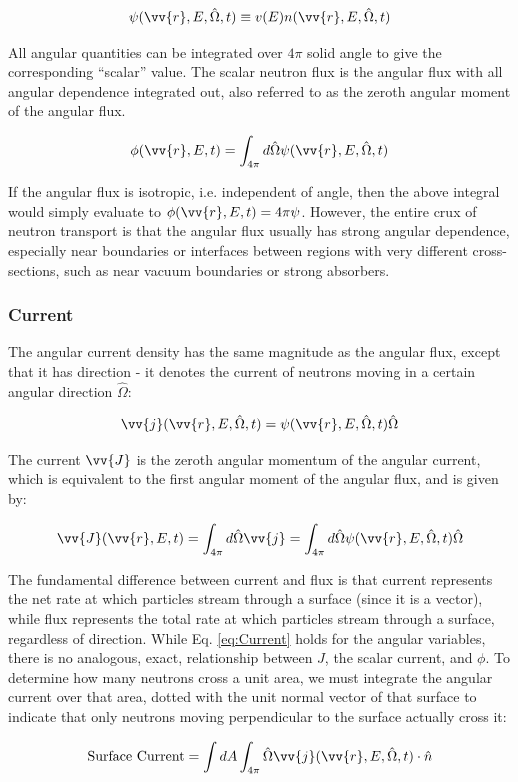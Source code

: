 \documentclass[10pt]{article}
\newcommand{\beq}{\begin{equation}}
\newcommand{\eeq}{\end{equation}}
\newcommand{\hO}{\hat{\Omega}}
\newcommand{\spa}{(\vv{r}, E, \hO, t)}
\newcommand{\spas}{(\vv{r},E,t)}
\begin{document}
\begin{flushleft}
\beq
\label{eq:AngularFlux}
\psi\spa \equiv v(E)n\spa
\eeq

All angular quantities can be integrated over \(4\pi\) solid angle to give the corresponding ``scalar'' value. The scalar neutron flux is the angular flux with all angular dependence integrated out, also referred to as the zeroth angular moment of the angular flux.

\beq
\label{eq:ScalarFlux}
\phi\spas = \int_{4\pi}^{} d\hO\psi\spa
\eeq

If the angular flux is isotropic, i.e. independent of angle, then the above integral would simply evaluate to \(\phi\spas=4\pi\psi\). However, the entire crux of neutron transport is that the angular flux usually has strong angular dependence, especially near boundaries or interfaces between regions with very different cross-sections, such as near vacuum boundaries or strong absorbers. 

\subsubsection{Current}

The angular current density has the same magnitude as the angular flux, except that it has direction - it denotes the current of neutrons moving in a certain angular direction \(\hO\):

\beq
\label{eq:AngularCurrent}
\vv{j}\spa = \psi\spa\hO  
\eeq

The current \(\vv{J}\) is the zeroth angular momentum of the angular current, which is equivalent to the first angular moment of the angular flux, and is given by:

\beq
\label{eq:Current}
\vv{J}(\vv{r},E,t)=\int_{4\pi}^{}d\hO  \vv{j}=\int_{4\pi}^{}d\hO\psi\spa\hO  
\eeq

The fundamental difference between current and flux is that current represents the net rate at which particles stream through a surface (since it is a vector), while flux represents the total rate at which particles stream through a surface, regardless of direction. While Eq. \ref{eq:Current} holds for the angular variables, there is no analogous, exact, relationship between \(J\), the scalar current, and \(\phi\). To determine how many neutrons cross a unit area, we must integrate the angular current over that area, dotted with the unit normal vector of that surface to indicate that only neutrons moving perpendicular to the surface actually cross it:

\beq
\label{eq:AngularCurrent}
\textrm{Surface Current} = \int dA \int_{4\pi}^{}\hO\vv{j}\spa \cdot\hat{n}
\eeq


\end{flushleft}
\end{document}
